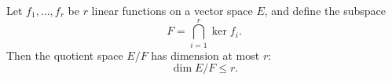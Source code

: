 Let $f_1, \ldots, f_r$ be $r$ linear functions on a vector space $E$, and define the subspace
$$
F = \bigcap_{i=1}^{r} \ker f_i.
$$
Then the quotient space $E/F$ has dimension at most $r$:
$$
\dim E/F \leq r.
$$
